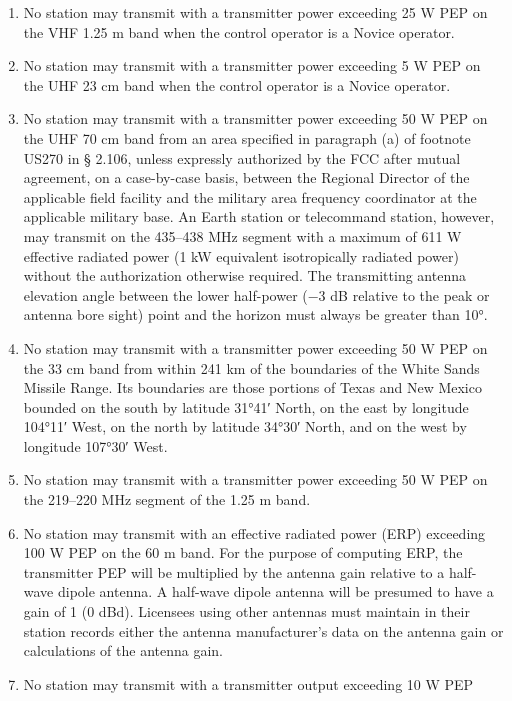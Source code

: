 \documentclass[
  letterpaper,
  DIV=11,
  numbers=noendperiod]{scrreport}
\begin{document}
\begin{enumerate}
\def\labelenumi{(\alph{enumi})}
\setcounter{enumi}{3}
\item
  No station may transmit with a transmitter power exceeding 25 W PEP on
  the VHF 1.25 m band when the control operator is a Novice operator.
\item
  No station may transmit with a transmitter power exceeding 5 W PEP on
  the UHF 23 cm band when the control operator is a Novice operator.
\item
  No station may transmit with a transmitter power exceeding 50 W PEP on
  the UHF 70 cm band from an area specified in paragraph (a) of footnote
  US270 in § 2.106, unless expressly authorized by the FCC after mutual
  agreement, on a case-by-case basis, between the Regional Director of
  the applicable field facility and the military area frequency
  coordinator at the applicable military base. An Earth station or
  telecommand station, however, may transmit on the 435--438 MHz segment
  with a maximum of 611 W effective radiated power (1 kW equivalent
  isotropically radiated power) without the authorization otherwise
  required. The transmitting antenna elevation angle between the lower
  half-power (−3 dB relative to the peak or antenna bore sight) point
  and the horizon must always be greater than 10°.
\item
  No station may transmit with a transmitter power exceeding 50 W PEP on
  the 33 cm band from within 241 km of the boundaries of the White Sands
  Missile Range. Its boundaries are those portions of Texas and New
  Mexico bounded on the south by latitude 31°41′ North, on the east by
  longitude 104°11′ West, on the north by latitude 34°30′ North, and on
  the west by longitude 107°30′ West.
\item
  No station may transmit with a transmitter power exceeding 50 W PEP on
  the 219--220 MHz segment of the 1.25 m band.
\item
  No station may transmit with an effective radiated power (ERP)
  exceeding 100 W PEP on the 60 m band. For the purpose of computing
  ERP, the transmitter PEP will be multiplied by the antenna gain
  relative to a half-wave dipole antenna. A half-wave dipole antenna
  will be presumed to have a gain of 1 (0 dBd). Licensees using other
  antennas must maintain in their station records either the antenna
  manufacturer's data on the antenna gain or calculations of the antenna
  gain.
\item
  No station may transmit with a transmitter output exceeding 10 W PEP

\end{enumerate}
\end{document}
